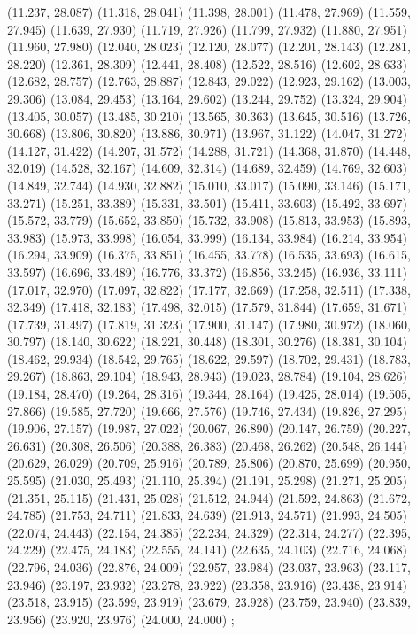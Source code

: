 {  (11.237, 28.087)
  (11.318, 28.041)
  (11.398, 28.001)
  (11.478, 27.969)
  (11.559, 27.945)
  (11.639, 27.930)
  (11.719, 27.926)
  (11.799, 27.932)
  (11.880, 27.951)
  (11.960, 27.980)
  (12.040, 28.023)
  (12.120, 28.077)
  (12.201, 28.143)
  (12.281, 28.220)
  (12.361, 28.309)
  (12.441, 28.408)
  (12.522, 28.516)
  (12.602, 28.633)
  (12.682, 28.757)
  (12.763, 28.887)
  (12.843, 29.022)
  (12.923, 29.162)
  (13.003, 29.306)
  (13.084, 29.453)
  (13.164, 29.602)
  (13.244, 29.752)
  (13.324, 29.904)
  (13.405, 30.057)
  (13.485, 30.210)
  (13.565, 30.363)
  (13.645, 30.516)
  (13.726, 30.668)
  (13.806, 30.820)
  (13.886, 30.971)
  (13.967, 31.122)
  (14.047, 31.272)
  (14.127, 31.422)
  (14.207, 31.572)
  (14.288, 31.721)
  (14.368, 31.870)
  (14.448, 32.019)
  (14.528, 32.167)
  (14.609, 32.314)
  (14.689, 32.459)
  (14.769, 32.603)
  (14.849, 32.744)
  (14.930, 32.882)
  (15.010, 33.017)
  (15.090, 33.146)
  (15.171, 33.271)
  (15.251, 33.389)
  (15.331, 33.501)
  (15.411, 33.603)
  (15.492, 33.697)
  (15.572, 33.779)
  (15.652, 33.850)
  (15.732, 33.908)
  (15.813, 33.953)
  (15.893, 33.983)
  (15.973, 33.998)
  (16.054, 33.999)
  (16.134, 33.984)
  (16.214, 33.954)
  (16.294, 33.909)
  (16.375, 33.851)
  (16.455, 33.778)
  (16.535, 33.693)
  (16.615, 33.597)
  (16.696, 33.489)
  (16.776, 33.372)
  (16.856, 33.245)
  (16.936, 33.111)
  (17.017, 32.970)
  (17.097, 32.822)
  (17.177, 32.669)
  (17.258, 32.511)
  (17.338, 32.349)
  (17.418, 32.183)
  (17.498, 32.015)
  (17.579, 31.844)
  (17.659, 31.671)
  (17.739, 31.497)
  (17.819, 31.323)
  (17.900, 31.147)
  (17.980, 30.972)
  (18.060, 30.797)
  (18.140, 30.622)
  (18.221, 30.448)
  (18.301, 30.276)
  (18.381, 30.104)
  (18.462, 29.934)
  (18.542, 29.765)
  (18.622, 29.597)
  (18.702, 29.431)
  (18.783, 29.267)
  (18.863, 29.104)
  (18.943, 28.943)
  (19.023, 28.784)
  (19.104, 28.626)
  (19.184, 28.470)
  (19.264, 28.316)
  (19.344, 28.164)
  (19.425, 28.014)
  (19.505, 27.866)
  (19.585, 27.720)
  (19.666, 27.576)
  (19.746, 27.434)
  (19.826, 27.295)
  (19.906, 27.157)
  (19.987, 27.022)
  (20.067, 26.890)
  (20.147, 26.759)
  (20.227, 26.631)
  (20.308, 26.506)
  (20.388, 26.383)
  (20.468, 26.262)
  (20.548, 26.144)
  (20.629, 26.029)
  (20.709, 25.916)
  (20.789, 25.806)
  (20.870, 25.699)
  (20.950, 25.595)
  (21.030, 25.493)
  (21.110, 25.394)
  (21.191, 25.298)
  (21.271, 25.205)
  (21.351, 25.115)
  (21.431, 25.028)
  (21.512, 24.944)
  (21.592, 24.863)
  (21.672, 24.785)
  (21.753, 24.711)
  (21.833, 24.639)
  (21.913, 24.571)
  (21.993, 24.505)
  (22.074, 24.443)
  (22.154, 24.385)
  (22.234, 24.329)
  (22.314, 24.277)
  (22.395, 24.229)
  (22.475, 24.183)
  (22.555, 24.141)
  (22.635, 24.103)
  (22.716, 24.068)
  (22.796, 24.036)
  (22.876, 24.009)
  (22.957, 23.984)
  (23.037, 23.963)
  (23.117, 23.946)
  (23.197, 23.932)
  (23.278, 23.922)
  (23.358, 23.916)
  (23.438, 23.914)
  (23.518, 23.915)
  (23.599, 23.919)
  (23.679, 23.928)
  (23.759, 23.940)
  (23.839, 23.956)
  (23.920, 23.976)
  (24.000, 24.000)
};

